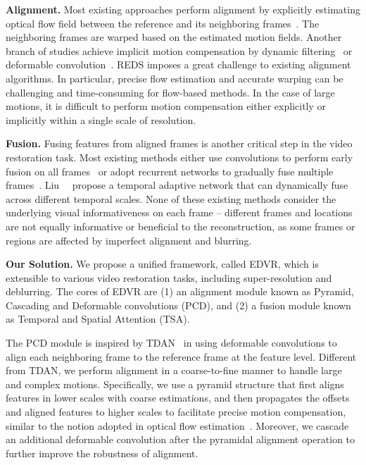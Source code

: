 \documentclass[10pt,twocolumn,letterpaper]{article}
\begin{document}
\noindent\textbf{Alignment.}
Most existing approaches perform alignment by explicitly estimating optical flow field between the reference and its neighboring frames~\cite{caballero2017real,xue2017video,kim2018spatio}. The neighboring frames are warped based on the estimated motion fields. Another branch of studies achieve implicit motion compensation by dynamic filtering~\cite{jo2018deep} or deformable convolution~\cite{tian2018tdan}.
REDS imposes a great challenge to existing alignment algorithms.
In particular, precise flow estimation and accurate warping can be challenging and time-consuming for flow-based methods. In the case of large motions, it is difficult to perform motion compensation either explicitly or implicitly within a single scale of resolution. 


\noindent\textbf{Fusion.}
Fusing features from aligned frames is another critical step in the video restoration task. Most existing methods either use convolutions to perform early fusion on all frames~\cite{caballero2017real} or adopt recurrent networks to gradually fuse multiple frames~\cite{sajjadi2018frame, haris2019recurrent}. 
Liu~\etal~\cite{liu2017robust} propose a temporal adaptive network that can dynamically fuse across different
temporal scales. None of these existing methods consider the underlying visual informativeness on each frame -- different frames and locations are not equally informative or beneficial to the reconstruction, as some frames or regions are affected by imperfect alignment and blurring.

\noindent\textbf{Our Solution.}
We propose a unified framework, called EDVR, which is extensible to various video restoration tasks, including super-resolution and deblurring. 
The cores of EDVR are (1) an alignment module known as Pyramid, Cascading and Deformable convolutions (PCD), and (2) a fusion module known as Temporal and Spatial Attention (TSA).

The PCD module is inspired by TDAN~\cite{tian2018tdan} in using deformable convolutions to align each neighboring frame to the reference frame at the feature level. 
Different from TDAN, we perform alignment in a coarse-to-fine manner to handle large and complex motions.
Specifically, we use a pyramid structure that first aligns features in lower scales with coarse estimations, and then propagates the offsets and aligned features to higher scales to facilitate precise motion compensation, similar to the notion adopted in optical flow estimation~\cite{hui18liteflownet,ilg2017flownet}. Moreover, we cascade an additional deformable convolution after the pyramidal alignment operation to further improve the robustness of alignment.
\end{document}
